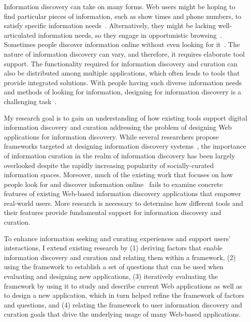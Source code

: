 Information discovery can take on many forms. Web users might be hoping to find particular pieces of information, such as show times and phone numbers, to satisfy specific information needs~\cite{proper1999information}. Alternatively, they might be lacking well-articulated information needs, so they engage in opportunistic browsing~\cite{lindley2012s}. Sometimes people discover information online without even looking for it~\cite{bates1986exploratory}. The nature of information discovery can vary, and therefore, it requires elaborate tool support. The functionality required for information discovery and curation can also be distributed among multiple applications, which often leads to tools that provide integrated solutions. With people having such diverse information needs and methods of looking for information, designing for information discovery is a challenging task~\cite{conaway2010designing, marchionini2006exploratory}.

My research goal is to gain an understanding of how existing tools support digital information discovery and curation addressing the problem of designing Web applications for information discovery. While several researchers propose frameworks targeted at designing information discovery systems~\cite{proper1999information, kerne2004information}, the importance of information curation in the realm of information discovery has been largely overlooked despite the rapidly increasing popularity of socially-curated information spaces. Moreover, much of the existing work that focuses on how people look for and discover information online~\cite{bates1986exploratory, choo2000information, ellis1989behavioural, kellar2006goal, lindley2012s, morrison2001taxonomic, sellen2002knowledge} fails to examine concrete features of existing Web-based information discovery applications that empower real-world users. More research is necessary to determine how different tools and their features provide fundamental support for information discovery and curation.

To enhance information seeking and curating experiences and support users' interactions, I extend existing research by (1) deriving factors that enable information discovery and curation and relating them within a framework, (2) using the framework to establish a set of questions that can be used when evaluating and designing new applications, (3) iteratively evaluating the framework by using it to study and describe current Web applications as well as to design a new application, which in turn helped refine the framework of factors and questions, and (4) relating the framework to user information discovery and curation goals that drive the underlying usage of many Web-based applications. 

